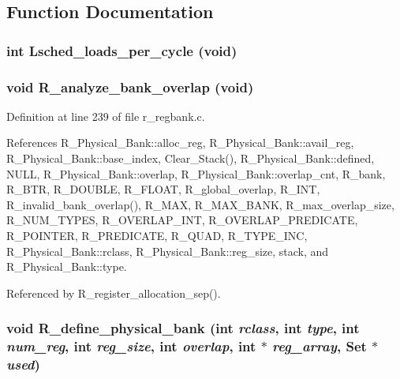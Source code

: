 \subsection{Function Documentation}
\subsubsection{\setlength{\rightskip}{0pt plus 5cm}int Lsched\_\-loads\_\-per\_\-cycle (void)}\label{r__regbank_8c_8dc9c8930405b68ae031fc5d17082581}


\subsubsection{\setlength{\rightskip}{0pt plus 5cm}void R\_\-analyze\_\-bank\_\-overlap (void)}\label{r__regbank_8c_be0fcd246b90863ed5c894f143caf432}




Definition at line 239 of file r\_\-regbank.c.

References R\_\-Physical\_\-Bank::alloc\_\-reg, R\_\-Physical\_\-Bank::avail\_\-reg, R\_\-Physical\_\-Bank::base\_\-index, Clear\_\-Stack(), R\_\-Physical\_\-Bank::defined, NULL, R\_\-Physical\_\-Bank::overlap, R\_\-Physical\_\-Bank::overlap\_\-cnt, R\_\-bank, R\_\-BTR, R\_\-DOUBLE, R\_\-FLOAT, R\_\-global\_\-overlap, R\_\-INT, R\_\-invalid\_\-bank\_\-overlap(), R\_\-MAX, R\_\-MAX\_\-BANK, R\_\-max\_\-overlap\_\-size, R\_\-NUM\_\-TYPES, R\_\-OVERLAP\_\-INT, R\_\-OVERLAP\_\-PREDICATE, R\_\-POINTER, R\_\-PREDICATE, R\_\-QUAD, R\_\-TYPE\_\-INC, R\_\-Physical\_\-Bank::rclass, R\_\-Physical\_\-Bank::reg\_\-size, stack, and R\_\-Physical\_\-Bank::type.

Referenced by R\_\-register\_\-allocation\_\-sep().
\subsubsection{\setlength{\rightskip}{0pt plus 5cm}void R\_\-define\_\-physical\_\-bank (int {\em rclass}, int {\em type}, int {\em num\_\-reg}, int {\em reg\_\-size}, int {\em overlap}, int $\ast$ {\em reg\_\-array}, \bf{Set} $\ast$ {\em used})}\label{r__regbank_8c_0261576ceab18c14c78be7e5a8bea4aa}





